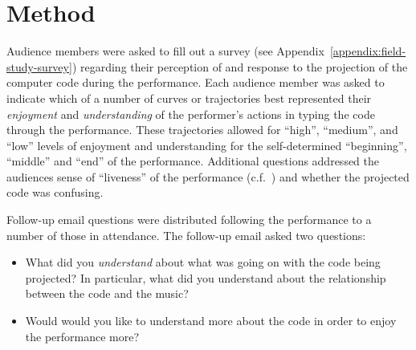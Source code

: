 \section{Method}

Audience members were asked to fill out a survey (see Appendix~\ref{appendix:field-study-survey}) regarding their perception of and response to the projection of the computer code during the performance. Each audience member was asked to indicate which of a number of curves or trajectories best represented their \emph{enjoyment} and \emph{understanding} of the performer's actions in typing the code through the performance. These trajectories allowed for ``high'', ``medium'', and ``low'' levels of enjoyment and understanding for the self-determined ``beginning'', ``middle'' and ``end'' of the performance. Additional questions addressed the audiences sense of ``liveness'' of the performance (c.f.~\cite{Auslander}) and whether the projected code was confusing.

Follow-up email questions were distributed following the performance to a number of those in attendance. The follow-up email asked two questions: 
\begin{itemize}
\item What did you \emph{understand} about what was going on with the code being projected? In particular, what did you understand about the relationship between the code and the music? 
\item Would would you like to understand more about the code in order to enjoy the performance more? 
\end{itemize}

